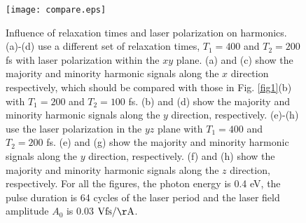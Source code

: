 \documentclass[checkin,showpacs,psfig,aps,pra]{revtex4}
\begin{document}
\begin{figure}
\texttt{[image: compare.eps]}
\caption{{Influence of relaxation times and laser polarization on
    harmonics.  (a)-(d) use a different set of relaxation times,
    $T_1=400$ and $T_2=200$ fs with laser polarization within the $xy$
    plane.  (a) and (c) show the majority and minority harmonic
    signals along the $x$ direction respectively, which should be
    compared with those in Fig. \ref{fig1}(b) with $T_1=200$ and
    $T_2=100$ fs.  (b) and (d) show the majority and minority harmonic
    signals along the $y$ direction, respectively. (e)-(h) use the
    laser polarization in the $yz$ plane with $T_1=400$ and $T_2=200$
    fs.  (e) and (g) show the majority and minority harmonic signals
    along the $y$ direction, respectively.  (f) and (h) show the
    majority and minority harmonic signals along the $z$ direction,
    respectively.  For all the figures, the photon energy is 0.4 eV,
    the pulse duration is 64 cycles of the laser period and the laser
    field amplitude $A_0$ is 0.03 $\rm Vfs/\AA$.  } }
\label{fig4}
\end{figure}
\end{document}
